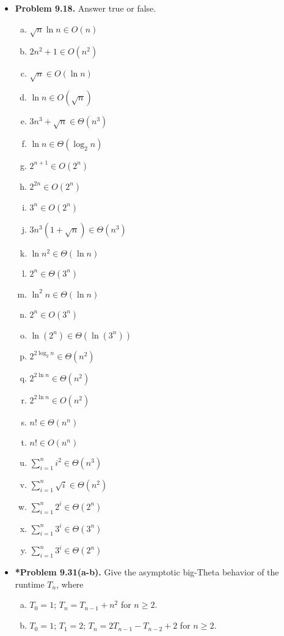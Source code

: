 \documentclass[11pt]{article}
\begin{document}
\begin{itemize}
\newpage

\item \textbf{Problem 9.18.}
Answer true or false.
\begin{multicols}{3}
\begin{enumerate}[(a)]
\item $\sqrt{n}\ln n\in O(n)$
\item $2n^2+1\in O(n^2)$
\item $\sqrt{n}\in O(\ln n)$
\item $\ln n\in O(\sqrt{n})$
\item $3n^3+\sqrt{n}\in\Theta(n^3)$
\item $\ln n\in\Theta(\log_2 n)$
\item $2^{n+1}\in O(2^n)$
\item $2^{2n}\in O(2^n)$
\item $3^n\in O(2^n)$
\item $3n^3(1+\sqrt{n})\in\Theta(n^3)$
\item $\ln n^2\in\Theta(\ln n)$
\item $2^n\in\Theta(3^n)$
\item $\ln^2 n\in\Theta(\ln n)$
\item $2^n\in O(3^n)$
\item $\ln(2^n)\in\Theta(\ln(3^n))$
\item $2^{2\log_2 n}\in\Theta(n^2)$
\item $2^{2\ln n}\in\Theta(n^2)$
\item $2^{2\ln n}\in O(n^2)$
\item $n!\in\Theta(n^n)$
\item $n!\in O(n^n)$
\item $\displaystyle \sum_{i=1}^n i^2\in\Theta(n^3)$
\item $\displaystyle \sum_{i=1}^n \sqrt{i}\in\Theta(n^2)$
\item $\displaystyle \sum_{i=1}^n 2^i\in\Theta(2^n)$
\item $\displaystyle \sum_{i=1}^n 3^i\in\Theta(3^n)$
\item $\displaystyle \sum_{i=1}^n 3^i\in\Theta(2^n)$
\end{enumerate}
\end{multicols}

\vspace{0.1in}

\item \textbf{*Problem 9.31(a-b).}
Give the asymptotic big-Theta behavior of the runtime $T_n$, where
\begin{enumerate}[(a)]
\item $T_0=1$; $T_n=T_{n-1}+n^2$ for $n\ge 2$.
\item $T_0=1$; $T_1=2$; $T_n=2T_{n-1}-T_{n-2}+2$ for $n\ge 2$.
\end{enumerate}


\end{itemize}
\end{document}
